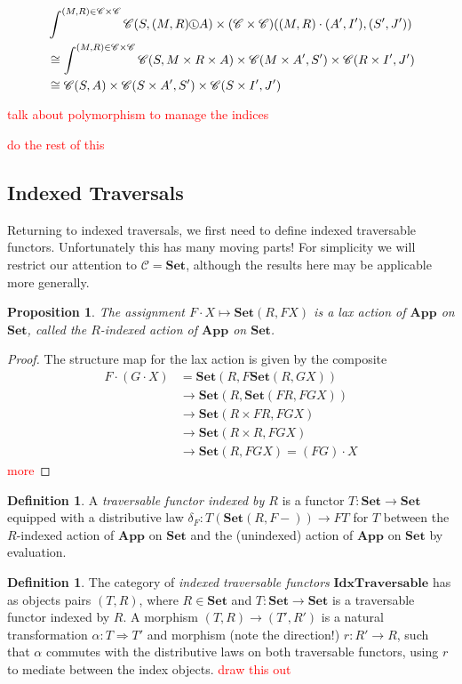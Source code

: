 \documentclass[11pt,letterpaper]{article}
\theoremstyle{plain}
\newtheorem{proposition}[theorem]{Proposition}
\theoremstyle{definition}
\newtheorem{definition}[theorem]{Definition}
\newcommand{\C}{\mathscr{C}}
\newcommand{\Set}{\mathbf{Set}}
\newcommand{\App}{\mathbf{App}}
\newcommand{\IdxTraversable}{\mathbf{IdxTraversable}}
\newcommand{\act}{\cdot}
\newcommand*\circled[1]{\tikz[baseline={([yshift=-0.65ex]current bounding box.center)}]{
   \node[shape=circle,draw,inner sep=1pt] (char) {#1};}}
\newcommand{\actL}{{\circled{\tiny$\mathsf{L}$}}}
\newcommand{\todo}[1]{\textcolor{red}{\small #1}}
\begin{document}
\begin{align*}
  &\int^{(M, R) \in \C \times \C} \C(S, (M, R) \actL A) \times (\C \times \C)((M, R) \cdot (A', I'), (S', J')) \\
  &\cong \int^{(M, R) \in \C \times \C} \C(S, M \times R \times A) \times \C(M \times A', S') \times \C(R \times I', J') \\
  &\cong  \C(S, A) \times \C(S \times A', S') \times \C(S \times I', J')
\end{align*}

\todo{talk about polymorphism to manage the indices}

\todo{do the rest of this}

\subsection{Indexed Traversals}

Returning to indexed traversals, we first need to define indexed traversable functors. Unfortunately this has many moving parts! For simplicity we will restrict our attention to $\C = \Set$, although the results here may be applicable more generally.

\begin{proposition}
The assignment $F \act X \mapsto \Set(R, FX)$ is a lax action of $\App$ on $\Set$, called the \emph{$R$-indexed action of $\App$ on $\Set$}.
\end{proposition}
\begin{proof}
The structure map for the lax action is given by the composite
\begin{align*}
F \act (G \act X) &= \Set(R, F\Set(R, GX)) \\
&\to \Set(R, \Set(FR, FGX)) \\
&\to \Set(R \times FR, FGX) \\
&\to \Set(R \times R, FGX) \\
&\to \Set(R, FGX) = (FG) \act X
\end{align*}
\todo{more}
\end{proof}

\begin{definition}
A \emph{traversable functor indexed by $R$} is a functor $T : \Set \to \Set$ equipped with a distributive law $\delta_F : T(\Set(R, F-)) \to FT$ for $T$ between the $R$-indexed action of $\App$ on $\Set$ and the (unindexed) action of $\App$ on $\Set$ by evaluation.
\end{definition}

\begin{definition}
The category of \emph{indexed traversable functors} $\IdxTraversable$ has as objects pairs $(T, R)$, where $R \in \Set$ and $T : \Set \to \Set$ is a traversable functor indexed by $R$. A morphism $(T, R) \to (T', R')$ is a natural transformation $\alpha : T \Rightarrow T'$ and morphism (note the direction!) $r : R' \to R$, such that $\alpha$ commutes with the distributive laws on both traversable functors, using $r$ to mediate between the index objects. \todo{draw this out}
\end{definition}
\end{document}
